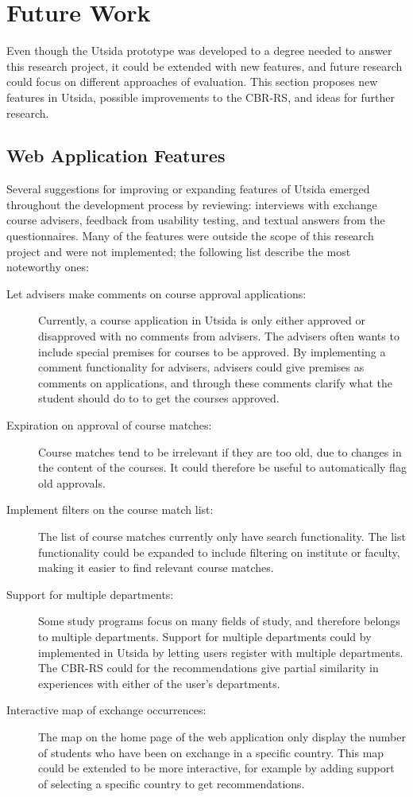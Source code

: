 \section{Future Work}

Even though the Utsida prototype was developed to a degree needed to answer this research project, it could be extended with new features, and future research could focus on different approaches of evaluation. This section proposes new features in Utsida, possible improvements to the CBR-RS, and ideas for further research.

\subsection{Web Application Features}

Several suggestions for improving or expanding features of Utsida emerged throughout the development process by reviewing: interviews with exchange course advisers, feedback from usability testing, and textual answers from the questionnaires. Many of the features were outside the scope of this research project and were not implemented; the following list describe the most noteworthy ones:

\begin{description} 
    \item[Let advisers make comments on course approval applications:] Currently, a course application in Utsida is only either approved or disapproved with no comments from advisers. The advisers often wants to include special premises for courses to be approved. By implementing a comment functionality for advisers, advisers could give premises as comments on applications, and through these comments clarify what the student should do to to get the courses approved.
    \item[Expiration on approval of course matches:] Course matches tend to be irrelevant if they are too old, due to changes in the content of the courses. It could therefore be useful to automatically flag old approvals.
    \item[Implement filters on the course match list:] The list of course matches currently only have search functionality. The list functionality could be expanded to include filtering on institute or faculty, making it easier to find relevant course matches.
    \item[Support for multiple departments:] Some study programs focus on many fields of study, and therefore belongs to multiple departments. Support for multiple departments could by implemented in Utsida by letting users register with multiple departments. The CBR-RS could for the recommendations give partial similarity in experiences with either of the user's departments.
    \item[Interactive map of exchange occurrences:] The map on the home page of the web application only display the number of students who have been on exchange in a specific country. This map could be extended to be more interactive, for example by adding support of selecting a specific country to get recommendations.
\end{description}


